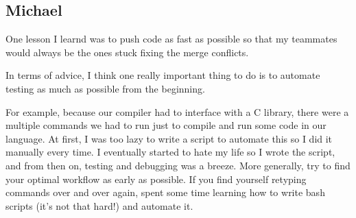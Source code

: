 \subsection{Michael}

One lesson I learnd was to push code as fast as possible so that my teammates would always be the ones stuck fixing the merge conflicts.

In terms of advice, I think one really important thing to do is to automate testing as much as possible from the beginning.

For example, because our compiler had to interface with a C library, there were a multiple commands we had to run just to compile and run some code in our language. At first, I was too lazy to write a script to automate this so I did it manually every time. I eventually started to hate my life so I wrote the script, and from then on, testing and debugging was a breeze. More generally, try to find your optimal workflow as early as possible. If you find yourself retyping commands over and over again, spent some time learning how to write bash scripts (it's not that hard!) and automate it.
